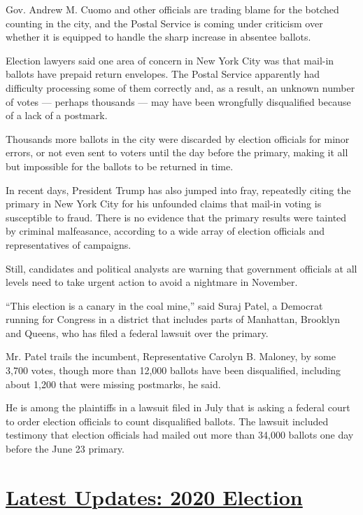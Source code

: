 Gov. Andrew M. Cuomo and other officials are trading blame for the
botched counting in the city, and the Postal Service is coming under
criticism over whether it is equipped to handle the sharp increase in
absentee ballots.

Election lawyers said one area of concern in New York City was that
mail-in ballots have prepaid return envelopes. The Postal Service
apparently had difficulty processing some of them correctly and, as a
result, an unknown number of votes --- perhaps thousands --- may have
been wrongfully disqualified because of a lack of a postmark.

Thousands more ballots in the city were discarded by election officials
for minor errors, or not even sent to voters until the day before the
primary, making it all but impossible for the ballots to be returned in
time.

In recent days, President Trump has also jumped into fray, repeatedly
citing the primary in New York City for his unfounded claims that
mail-in voting is susceptible to fraud. There is no evidence that the
primary results were tainted by criminal malfeasance, according to a
wide array of election officials and representatives of campaigns.

Still, candidates and political analysts are warning that government
officials at all levels need to take urgent action to avoid a nightmare
in November.

``This election is a canary in the coal mine,'' said Suraj Patel, a
Democrat running for Congress in a district that includes parts of
Manhattan, Brooklyn and Queens, who has filed a federal lawsuit over the
primary.

Mr. Patel trails the incumbent, Representative Carolyn B. Maloney, by
some 3,700 votes, though more than 12,000 ballots have been
disqualified, including about 1,200 that were missing postmarks, he
said.

He is among the plaintiffs in a lawsuit filed in July that is asking a
federal court to order election officials to count disqualified ballots.
The lawsuit included testimony that election officials had mailed out
more than 34,000 ballots one day before the June 23 primary.

\hypertarget{latest-updates-2020-election}{%
\section{\texorpdfstring{\href{https://www.nytimes.com/2020/08/03/us/elections/biden-vs-trump.html?action=click\&pgtype=Article\&state=default\&region=MAIN_CONTENT_1\&context=storylines_live_updates}{Latest
Updates: 2020
Election}}{Latest Updates: 2020 Election}}\label{latest-updates-2020-election}}

